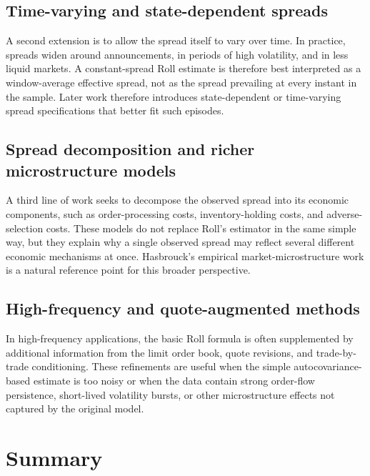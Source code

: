 \documentclass[11pt]{article}
\theoremstyle{remark}
\theoremstyle{definition}
\begin{document}
\subsection{Time-varying and state-dependent spreads}
A second extension is to allow the spread itself to vary over time. In practice, spreads widen around announcements, in periods of high volatility, and in less liquid markets. A constant-spread Roll estimate is therefore best interpreted as a window-average effective spread, not as the spread prevailing at every instant in the sample. Later work therefore introduces state-dependent or time-varying spread specifications that better fit such episodes.

\subsection{Spread decomposition and richer microstructure models}
A third line of work seeks to decompose the observed spread into its economic components, such as order-processing costs, inventory-holding costs, and adverse-selection costs. These models do not replace Roll's estimator in the same simple way, but they explain why a single observed spread may reflect several different economic mechanisms at once. Hasbrouck's empirical market-microstructure work is a natural reference point for this broader perspective.

\subsection{High-frequency and quote-augmented methods}
In high-frequency applications, the basic Roll formula is often supplemented by additional information from the limit order book, quote revisions, and trade-by-trade conditioning. These refinements are useful when the simple autocovariance-based estimate is too noisy or when the data contain strong order-flow persistence, short-lived volatility bursts, or other microstructure effects not captured by the original model.

\section{Summary}
\label{sec:summary}
\end{document}
